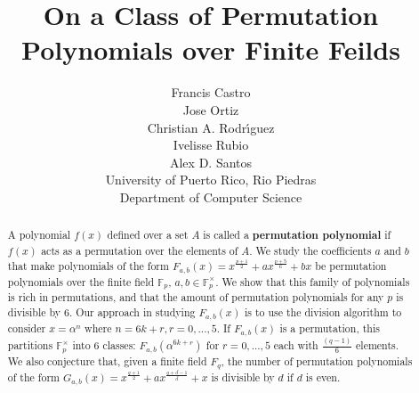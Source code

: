 \documentclass[12pt]{article}
\title{On a Class of Permutation Polynomials over Finite Feilds}
\author{Francis Castro \\ Jose Ortiz \\ Christian A. Rodr\'{\i}guez \\ Ivelisse Rubio \\ Alex D. Santos \\ University of Puerto Rico, Rio Piedras \\ Department of Computer Science}
\date{}
\begin{document}
\maketitle

\begin{abstract}

A polynomial $f(x)$ defined over a set $A$ is called a \textbf{permutation polynomial} if $f(x)$ acts as a permutation over the elements of $A$. We study the coefficients $a$ and $b$ that make polynomials of the form $F_{a,b}(x)=x^{\frac{p+1}{2}} + ax^{\frac{p+5}{6}} + bx$ be permutation polynomials over the finite field $\mathbb{F}_{p}$, $a,b \in \mathbb{F}_{p}^{\times}$. We show that this family of polynomials is rich in permutations, and that the amount of permutation polynomials for any $p$ is divisible by $6$. Our approach in studying $F_{a,b}(x)$ is to use the division algorithm to consider $x=\alpha^{n}$ where $n=6k+r, r=0,...,5$. If $F_{a,b}(x)$ is a permutation, this partitions $\mathbb{F}_{p}^{\times}$ into 6 classes: $F_{a,b}(\alpha^{6k+r})$ for $r=0,...,5$ each with $\frac{(q-1)}{6}$ elements. We also conjecture that, given a finite field $F_q$, the number of permutation polynomials of the form $G_{a,b}(x)=x^{\frac{q+1}{2}} + ax^{\frac{q+d-1}{d}}+x$ is divisible by $d$ if $d$ is even.

\end{abstract}
\end{document}
